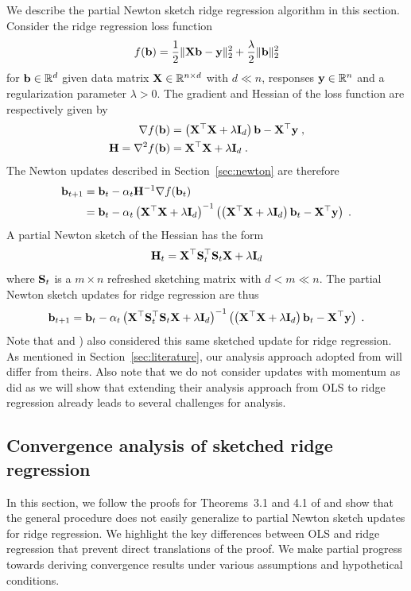We describe the partial Newton sketch ridge regression algorithm in this section. Consider the ridge regression loss function
\[
f(\mathbf{b}) = \frac{1}{2}\|\mathbf{X}\mathbf{b}-\mathbf{y}\|_2^2 + \frac{\lambda}{2}\|\mathbf{b}\|_2^2
\]
for $\mathbf{b}\in\mathbb{R}^d$ given data matrix $\mathbf{X}\in\mathbb{R}^{n\times d}$ with $d\ll n$, responses $\mathbf{y}\in\mathbb{R}^n$ and a regularization parameter $\lambda>0$. The gradient and Hessian of the loss function are respectively given by
\begin{align*}
\nabla f(\mathbf{b}) &= \left(\mathbf{X}^\top\mathbf{X}+\lambda\mathbf{I}_d\right)\mathbf{b} - \mathbf{X}^\top\mathbf{y} \;, \\
\mathbf{H} = \nabla^2f(\mathbf{b}) &= \mathbf{X}^\top\mathbf{X}+\lambda\mathbf{I}_d \;.
\end{align*}
The Newton updates described in Section~\ref{sec:newton} are therefore
\begin{align*}
\mathbf{b}_{t+1} &= \mathbf{b}_t - \alpha_t\mathbf{H}^{-1}\nabla f(\mathbf{b}_t) \\
&= \mathbf{b}_t - \alpha_t\left(\mathbf{X}^\top\mathbf{X}+\lambda\mathbf{I}_d\right)^{-1}\left(\left(\mathbf{X}^\top\mathbf{X}+\lambda\mathbf{I}_d\right)\mathbf{b}_t-\mathbf{X}^\top\mathbf{y}\right) \;.
\end{align*}
A partial Newton sketch of the Hessian has the form
\[
\mathbf{H}_t = \mathbf{X}^\top\mathbf{S}_t^\top\mathbf{S}_t\mathbf{X} + \lambda\mathbf{I}_d
\]
where $\mathbf{S}_t$ is a $m\times n$ refreshed sketching matrix with $d<m\ll n$. The partial Newton sketch updates for ridge regression are thus
\[
\mathbf{b}_{t+1} = \mathbf{b}_t - \alpha_t\left(\mathbf{X}^\top\mathbf{S}_t^\top\mathbf{S}_t\mathbf{X} + \lambda\mathbf{I}_d\right)^{-1}\left(\left(\mathbf{X}^\top\mathbf{X}+\lambda\mathbf{I}_d\right)\mathbf{b}_t-\mathbf{X}^\top\mathbf{y}\right) \;.
\]
Note that \citet{Chowdhury:2018} and \citet{Wang:2017}) also considered this same sketched update for ridge regression. As mentioned in Section~\ref{sec:literature}, our analysis approach adopted from \citet{Lacotte:2020} will differ from theirs. Also note that we do not consider updates with momentum as \citet{Lacotte:2020} did as we will show that extending their analysis approach from OLS to ridge regression already leads to several challenges for analysis.


\subsection{Convergence analysis of sketched ridge regression} \label{sec:theory}

In this section, we follow the proofs for Theorems~3.1 and 4.1 of \citep{Lacotte:2020} and show that the general procedure does not easily generalize to partial Newton sketch updates for ridge regression. We highlight the key differences between OLS and ridge regression that prevent direct translations of the proof. We make partial progress towards deriving convergence results under various assumptions and hypothetical conditions.
\\

